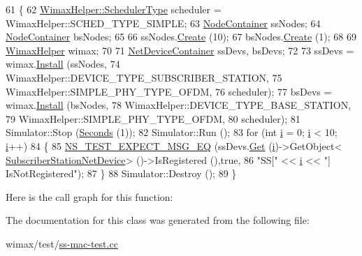\begin{DoxyCode}
61 \{
62   \hyperlink{classns3_1_1WimaxHelper_a27a40a8f601900126156781c2ca79406}{WimaxHelper::SchedulerType} scheduler = WimaxHelper::SCHED\_TYPE\_SIMPLE;
63   \hyperlink{classns3_1_1NodeContainer}{NodeContainer} ssNodes;
64   \hyperlink{classns3_1_1NodeContainer}{NodeContainer} bsNodes;
65 
66   ssNodes.\hyperlink{classns3_1_1NodeContainer_a787f059e2813e8b951cc6914d11dfe69}{Create} (10);
67   bsNodes.\hyperlink{classns3_1_1NodeContainer_a787f059e2813e8b951cc6914d11dfe69}{Create} (1);
68 
69   \hyperlink{classns3_1_1WimaxHelper}{WimaxHelper} wimax;
70 
71   \hyperlink{classns3_1_1NetDeviceContainer}{NetDeviceContainer} ssDevs, bsDevs;
72 
73   ssDevs = wimax.\hyperlink{classns3_1_1WimaxHelper_a9f0848e09c4b6db9cdde9872b38f6349}{Install} (ssNodes,
74                           WimaxHelper::DEVICE\_TYPE\_SUBSCRIBER\_STATION,
75                           WimaxHelper::SIMPLE\_PHY\_TYPE\_OFDM,
76                           scheduler);
77   bsDevs = wimax.\hyperlink{classns3_1_1WimaxHelper_a9f0848e09c4b6db9cdde9872b38f6349}{Install} (bsNodes,
78                           WimaxHelper::DEVICE\_TYPE\_BASE\_STATION,
79                           WimaxHelper::SIMPLE\_PHY\_TYPE\_OFDM,
80                           scheduler);
81   Simulator::Stop (\hyperlink{group__timecivil_ga33c34b816f8ff6628e33d5c8e9713b9e}{Seconds} (1));
82   Simulator::Run ();
83   \textcolor{keywordflow}{for} (\textcolor{keywordtype}{int} \hyperlink{bernuolliDistribution_8m_a6f6ccfcf58b31cb6412107d9d5281426}{i} = 0; \hyperlink{bernuolliDistribution_8m_a6f6ccfcf58b31cb6412107d9d5281426}{i} < 10; \hyperlink{bernuolliDistribution_8m_a6f6ccfcf58b31cb6412107d9d5281426}{i}++)
84     \{
85       \hyperlink{group__testing_ga7304ba46a28d8cf08dfdfd6499cf7068}{NS\_TEST\_EXPECT\_MSG\_EQ} (ssDevs.\hyperlink{classns3_1_1NetDeviceContainer_a677d62594b5c9d2dea155cc5045f4d0b}{Get} (\hyperlink{bernuolliDistribution_8m_a6f6ccfcf58b31cb6412107d9d5281426}{i})->GetObject<
      \hyperlink{classns3_1_1SubscriberStationNetDevice}{SubscriberStationNetDevice}> ()->IsRegistered (),\textcolor{keyword}{true},
86                              \textcolor{stringliteral}{"SS["} << \hyperlink{bernuolliDistribution_8m_a6f6ccfcf58b31cb6412107d9d5281426}{i} << \textcolor{stringliteral}{"] IsNotRegistered"});
87     \}
88   Simulator::Destroy ();
89 \}
\end{DoxyCode}


Here is the call graph for this function\+:




The documentation for this class was generated from the following file\+:\begin{DoxyCompactItemize}
\item 
wimax/test/\hyperlink{ss-mac-test_8cc}{ss-\/mac-\/test.\+cc}\end{DoxyCompactItemize}
